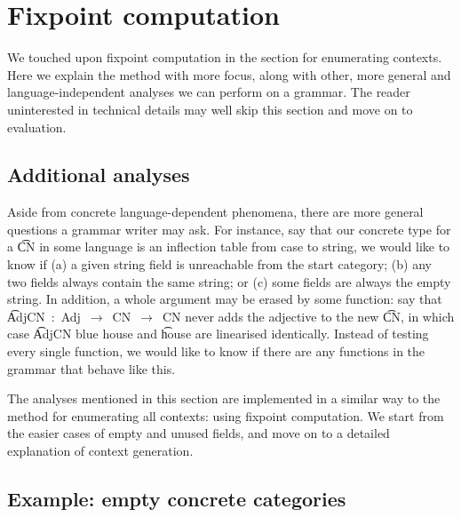 \section{Fixpoint computation}
\label{sec:moreFP}

We touched upon fixpoint computation in the section for enumerating
contexts. Here we explain the method with more focus, along with
other, more general and language-independent analyses we can perform
on a grammar. The reader uninterested in technical details may well
skip this section and move on to evaluation.

\subsection{Additional analyses}

Aside from concrete language-dependent phenomena, there are more
general questions a grammar writer may ask. For instance, say that our
concrete type for a \t{CN} in some language is an inflection table
from case to string, we would like to know if (a) a given string field
is unreachable from the start category; (b) any two fields always
contain the same string; or (c) some fields are always the empty
string.  In addition, a whole argument may be erased by some function:
say that \t{AdjCN~:~Adj~$\rightarrow$~CN~$\rightarrow$~CN} never adds
the adjective to the new \t{CN}, in which case \t{AdjCN blue house}
and \t{house} are linearised identically. Instead of testing every
single function, we would like to know if there are any functions in
the grammar that behave like this.


The analyses mentioned in this section are implemented in a similar
way to the method for enumerating all contexts: using fixpoint
computation. We start from the easier cases of empty and unused
fields, and move on to a detailed explanation of context generation.

\subsection{Example: empty concrete categories}

